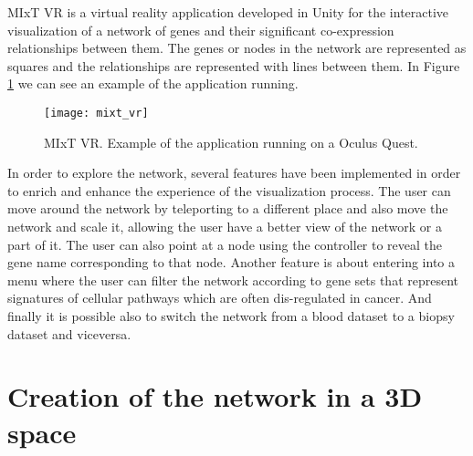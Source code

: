 %
%

MIxT VR is a virtual reality application developed in Unity for the interactive visualization of a network of genes and their significant co-expression relationships between them. The genes or nodes in the network are represented as squares and the relationships are represented with lines between them. In Figure \ref{fig:mixt_vr} we can see an example of the application running.

\begin{figure}[h!]
    \setlength{\tempheight}{15ex}
    \centering
    \texttt{[image: mixt\_vr]}
    \caption{MIxT VR. Example of the application running on a Oculus Quest.}
    \label{fig:mixt_vr}
\end{figure}

In order to explore the network, several features have been implemented in order to enrich and enhance the experience of the visualization process. The user can move around the network by teleporting to a different place and also move the network and scale it, allowing the user have a better view of the network or a part of it. The user can also point at a node using the controller to reveal the gene name corresponding to that node. Another feature is about entering into a menu where the user can filter the network according to gene sets that represent signatures of cellular pathways which are often dis-regulated in cancer. And finally it is possible also to switch the network from a blood dataset to a biopsy dataset and viceversa.

\section{Creation of the network in a 3D space}

